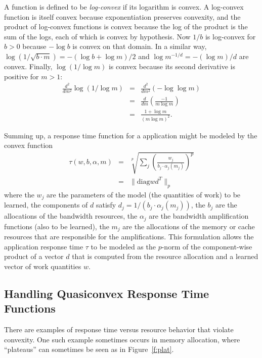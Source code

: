 A function is defined to be \emph{log-convex} if its logarithm is convex.
A log-convex function is itself convex because exponentiation preserves convexity,
and the product of log-convex functions is convex because the log of the product is the sum of the logs,
each of which is convex by hypothesis.
Now $1/b$ is log-convex for $b > 0$ because $-\log b$ is convex on that domain.
In a similar way, $\log(1/\sqrt{b\cdot m}) = -(\log b + \log m)/2$
and $\log m^{-1/d} = -(\log m)/d$ are convex.
Finally, $\log (1/\log m)$ is convex because its second derivative is positive for $m > 1$:
\begin{eqnarray*}
\frac{d^2}{dm^2}\log (1/\log m) &=& \frac{d^2}{dm^2}(-\log\log m)  \\
                                  &=& \frac{d}{dm}\left(\frac{-1}{m\log m}\right) \\
                                  &=& \frac{1 + \log m}{(m\log m)^2}.
\end{eqnarray*}

Summing up, a response time function for a application might be modeled by the convex function
\begin{eqnarray*}
\tau(w,b,\alpha,m) &=& \sqrt[p]{\sum_j \left(\frac{w_j}{b_j\cdot\alpha_j(m_j)}\right)^p}  \\
                   &=& \|\mbox{diag} wd^T \|_p
\end{eqnarray*}
where the $w_j$ are the parameters of the model (the quantities of work) to be learned,
the components of $d$ satisfy $d_j = 1/(b_j\cdot\alpha_j(m_j))$,
the $b_j$  are the allocations of the bandwidth resources,
the $\alpha_j$ are the bandwidth amplification functions (also to be learned),
the $m_j$ are the allocations of the memory or cache resources that are responsible for the amplifications.
This formulation allows the application response time $\tau$ to be modeled as the $p$-norm of
the component-wise product of a vector $d$ that is computed from the resource allocation
and a learned vector of work quantities $w$.

\subsection*{Handling Quasiconvex Response Time Functions}

There are examples of response time versus resource behavior that violate convexity.  One such example sometimes occurs in memory allocation, where ``plateaus'' can sometimes be seen as in Figure~\ref{f:plat}.

